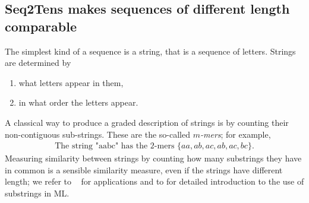 \documentclass{article} \usepackage{iclr2021_conference,times}
\theoremstyle{plain}
\theoremstyle{definition}
\begin{document}
\subsection{Seq2Tens makes sequences of different length comparable}\label{sec:different length}	
The simplest kind of a sequence is a string, that is a sequence of letters. Strings are determined by
\begin{enumerate}[label=(\roman*)]
\item  
  what letters appear in them,
  \item 
    in what order the letters appear.
\end{enumerate}
A classical way to produce a graded description of strings is by counting their non-contiguous sub-strings.
These are the so-called \emph{$ m $-mers}; for example,
\begin{align}
 \text{The string "aabc" has the 2-mers }  \{  aa, ab, ac, ab, ac, bc\}.
\end{align}
Measuring similarity between strings by counting how many substrings they have in common is a sensible similarity measure, even if the strings have different length; we refer to ~\citet{Leslie04} for applications and to \cite[Chapter 11]{Taylor00} for detailed introduction to the use of substrings in ML. 
\end{document}
